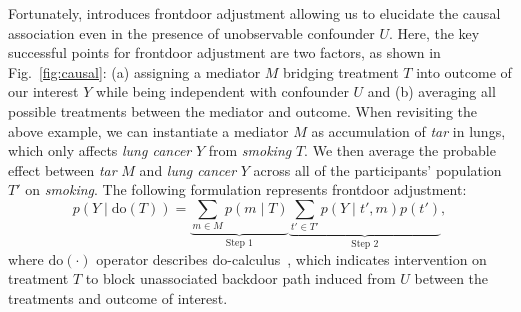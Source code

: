 \documentclass{article} \usepackage{iclr2024_conference,times}
\begin{document}
Fortunately, \citet{pearl2009causality} introduces frontdoor adjustment allowing us to elucidate the causal association even in the presence of unobservable confounder $U$. Here, the key successful points for frontdoor adjustment are two factors, as shown in Fig.~\ref{fig:causal}: (a) assigning a mediator $M$ bridging treatment $T$ into outcome of our interest $Y$ while being independent with confounder $U$ and (b) averaging all possible treatments between the mediator and outcome. When revisiting the above example, we can instantiate a mediator $M$ as accumulation of \textit{tar} in lungs, which only affects \textit{lung cancer} $Y$ from \textit{smoking} $T$. We then average the probable effect between \textit{tar} $M$ and \textit{lung cancer} $Y$ across all of the participants' population $T'$ on \textit{smoking}. The following formulation represents frontdoor adjustment:
\begin{equation}
\label{eqn:frontdoor}
    p(Y\mid \text{do}(T) )=\underbrace{\sum_{m\in M}p(m \mid T)}_{\text{Step 1}}\underbrace{\sum_{t'\in T'}{p(Y\mid t', m)}p(t')}_{\text{Step 2}},
\end{equation}
where $\text{do}(\cdot)$ operator describes do-calculus~\citep{pearl1995causal}, which indicates intervention on treatment $T$ to block unassociated backdoor path induced from $U$ between the treatments and outcome of interest.
\end{document}
